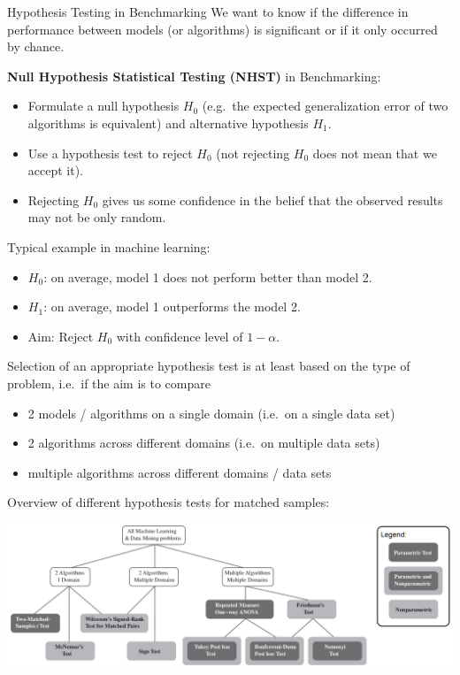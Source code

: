     \begin{frame}[c,allowframebreaks]{Hypothesis Testing in Benchmarking}
    We want to know if the difference in performance between models (or algorithms) is significant or if it only occurred by chance.

    \textbf{Null Hypothesis Statistical Testing (NHST)} in Benchmarking:

    \begin{itemize}
    \item Formulate a null hypothesis $H_0$ (e.g.\ the expected generalization
        error of two algorithms is equivalent) and alternative hypothesis $H_1$.
    \item Use a hypothesis test to reject $H_0$ (not rejecting $H_0$ does not mean that we accept it).
    \item Rejecting $H_0$ gives us some confidence in the belief that the observed results may not be only random.
    \end{itemize}

    Typical example in machine learning:

    \begin{itemize}
    \item $H_0$: on average, model 1 does not perform better than model 2.
    \item $H_1$: on average, model 1 outperforms the model 2.
    \item Aim: Reject $H_0$ with confidence level of $1-\alpha$.
    \end{itemize}

    \framebreak

    Selection of an appropriate hypothesis test is at least based on the type of
    problem, i.e.\ if the aim is to compare
    \begin{itemize}
    \item 2 models / algorithms on a single domain (i.e.\ on a single data set)
    \item 2 algorithms across different domains (i.e.\ on multiple data sets)
    \item multiple algorithms across different domains / data sets
    \end{itemize}

    Overview of different hypothesis tests for matched samples:

    \begin{center}
    \includegraphics[height=.45\textheight]{tests_overview.png}
    \end{center}

    \end{frame}

